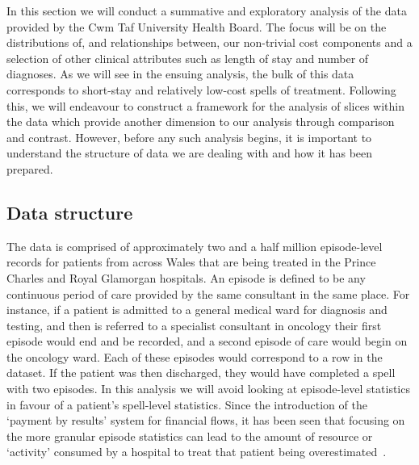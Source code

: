 In this section we will conduct a summative and exploratory analysis of the data
provided by the Cwm Taf University Health Board. The focus will be on the
distributions of, and relationships between, our non-trivial cost components
and a selection of other clinical attributes such as length of stay and number
of diagnoses. As we will see in the ensuing analysis, the bulk of this data
corresponds to short-stay and relatively low-cost spells of treatment. Following
this, we will endeavour to construct a framework for the analysis of slices
within the data which provide another dimension to our analysis through
comparison and contrast. However, before any such analysis begins, it is
important to understand the structure of data we are dealing with and how it has
been prepared.\\


\subsection{Data structure}\label{subsec:structure}

The data is comprised of approximately two and a half million episode-level
records for patients from across Wales that are being treated in the Prince
Charles and Royal Glamorgan hospitals. An episode is defined to be any
continuous period of care provided by the same consultant in the same place. For
instance, if a patient is admitted to a general medical ward for diagnosis and
testing, and then is referred to a specialist consultant in oncology their first
episode would end and be recorded, and a second episode of care would begin on
the oncology ward. Each of these episodes would correspond to a row in the
dataset. If the patient was then discharged, they would have completed a spell
with two episodes. In this analysis we will avoid looking at episode-level
statistics in favour of a patient's spell-level statistics. Since the
introduction of the `payment by results' system for financial flows, it has been
seen that focusing on the more granular episode statistics can lead to the
amount of resource or `activity' consumed by a hospital to treat that patient
being overestimated~\cite{spells_or_episodes}.\\

